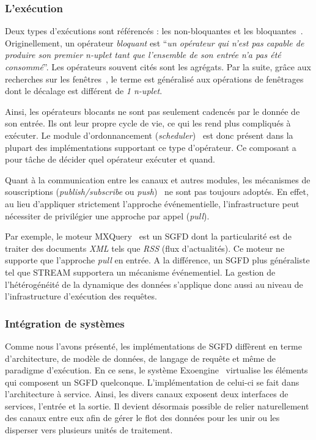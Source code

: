 \subsubsection{L'exécution}
Deux types d'exécutions sont référencés : les non-bloquantes et les  bloquantes~\cite{Babcock:issues}. Originellement, un opérateur \textit{bloquant} est \enquote{\it un opérateur qui n'est pas capable de produire son premier n-uplet tant que l'ensemble de son entrée n'a pas été consommé}. Les opérateurs souvent cités sont les agrégats. Par la suite, grâce aux recherches sur les fenêtres~\cite{Maier:semantics}, le terme est généralisé aux opérations de fenêtrages dont le décalage est différent de \textit{1 n-uplet}.

Ainsi, les opérateurs blocants ne sont pas seulement cadencés par le donnée de son entrée. Ils ont leur propre cycle de vie, ce qui les rend plus compliqués à exécuter. Le module d'ordonnancement (\textit{scheduler})~\cite{Carney:scheduling} est donc présent dans la plupart des implémentations supportant ce type d'opérateur. Ce composant a pour tâche de décider quel opérateur exécuter et quand.

Quant à la communication entre les canaux et autres modules, les mécanismes de souscriptions (\textit{publish/subscribe} ou \textit{push})~\cite{Eugster:publishsubscribe} ne sont pas toujours adoptés. En effet, au lieu d'appliquer strictement l'approche événementielle, l'infrastructure peut nécessiter de privilégier une approche par appel (\textit{pull}). 

Par exemple, le moteur MXQuery~\cite{Botan:MXQuery} est un SGFD dont la particularité est de traiter des documents \textit{XML} tels que \textit{RSS} (flux d'actualités). Ce moteur ne supporte que l'approche \textit{pull} en entrée. A la différence, un SGFD plus généraliste tel que STREAM supportera un mécanisme événementiel. La gestion de l'hétérogénéité de la dynamique des données s'applique donc aussi au niveau de l'infrastructure d'exécution des requêtes.

\subsubsection{Intégration de systèmes}
Comme nous l'avons présenté, les implémentations de SGFD diffèrent en terme d'architecture, de modèle de données, de langage de requête et même de paradigme d'exécution. En ce sens, le système Exoengine~\cite{Duller:virtualdsms} virtualise les éléments qui composent un SGFD quelconque. L'implémentation de celui-ci se fait dans l'architecture à service. Ainsi, les divers canaux exposent deux interfaces de services, l'entrée et la sortie. Il devient désormais possible de relier naturellement des canaux entre eux afin de gérer le flot des données pour les unir ou les disperser vers plusieurs unités de traitement.

